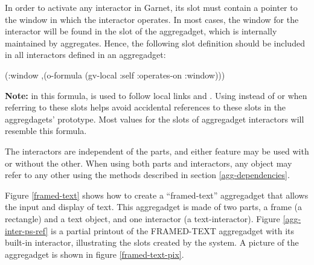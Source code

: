 In order to activate any interactor in Garnet, its  slot must
contain a pointer to the window in which the interactor operates.
In most cases, the window for the interactor will be found in
the  slot of the aggregadget, which is internally
maintained by aggregates.  Hence, the following slot definition should be
included in all interactors defined in an aggregadget:
\begin{programexample}
(:window ,(o-formula (gv-local :self :operates-on :window)))
\end{programexample}
{\bf Note:} in this formula,  is used to follow local
links  and .  Using  instead of
 or  when referring to these slots helps avoid accidental
references to these slots in the aggregdagets' prototype.
Most values for the  slots of aggregadget interactors will
resemble this formula.

The interactors are independent of the parts, and either feature
may be used with or without the other.  When using both parts and
interactors, any object may refer to any other using the methods described
in section \ref{agg-dependencies}.

Figure \ref{framed-text} shows how to create a ``framed-text'' aggregadget
that allows the input and display of text. This aggregadget is made of two
parts, a frame (a rectangle) and a text object, and one interactor
(a text-interactor).  Figure \ref{agg-inter-ps-ref} is a partial printout of
the FRAMED-TEXT aggregadget with its built-in interactor, illustrating the
slots created by the system.  A picture of the aggregadget is shown in
figure
\ref{framed-text-pix}.


